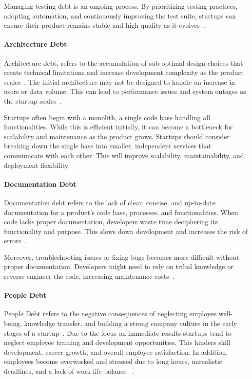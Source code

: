 Managing testing debt is an ongoing process.
By prioritizing testing practices, adopting automation, and continuously improving the test suite, startups can ensure their product remains stable and high-quality as it evolves~\cite{CrowneWhyStartupsFail, 1NewMess49:online}.

\paragraph{Architecture Debt}
Architecture debt, refers to the accumulation of sub-optimal design choices that create technical limitations and increase development complexity as the product scales~\cite{Startups4:online}.
The initial architecture may not be designed to handle an increase in users or data volume.
This can lead to performance issues and system outages as the startup scales~\cite{Qualityv77:online,Creating18:online}.

Startups often begin with a monolith, a single code base handling all functionalities.
While this is efficient initially, it can become a bottleneck for scalability and maintenance as the product grows.
Startups should consider breaking down the single base into smaller, independent services that communicate with each other.
This will improve scalability, maintainability, and deployment flexibility~\cite{Howtohan98:online, DesignSt86:online}

\paragraph{Documentation Debt}
Documentation debt refers to the lack of clear, concise, and up-to-date documentation for a product's code base, processes, and functionalities.
When code lacks proper documentation, developers waste time deciphering its functionality and purpose.
This slows down development and increases the risk of errors~\cite{The3Best94:online, 10.1145/3493244.3493254}.

Moreover, troubleshooting issues or fixing bugs becomes more difficult without proper documentation.
Developers might need to rely on tribal knowledge or reverse-engineer the code, increasing maintenance costs~\cite{DesignSt86:online}.

\paragraph{People Debt}
People Debt refers to the negative consequences of neglecting employee well-being, knowledge transfer, and building a strong company culture in the early stages of a startup~\cite{Blog21:online}. Due to the focus on immediate results startups tend to neglect employee training and development opportunities. This hinders skill development, career growth, and overall employee satisfaction. In addition, employees become overworked and stressed due to long hours, unrealistic deadlines, and a lack of work-life balance ~\cite{Besker2018}.


